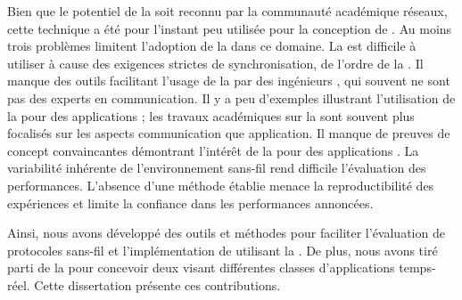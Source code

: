 \startsquarepar
Bien que le potentiel de la \ST soit reconnu par la communauté académique réseaux, cette technique a été pour l'instant peu utilisée pour la conception de \CPS.
Au moins trois problèmes limitent l'adoption de la \ST dans ce domaine.
\linebreak
{}La \ST est difficile à utiliser à cause des exigences strictes de synchronisation, de l'ordre de la \us.
Il manque des outils facilitant l'usage de la \ST par des ingénieurs \CPS, qui souvent ne sont pas des experts en communication.
\linebreak
Il y a peu d'exemples illustrant l'utilisation de la \ST pour des applications \CPS ; les travaux académiques sur la \ST sont souvent plus focalisés sur les aspects communication que application.
Il manque de preuves de concept convaincantes démontrant l'intérêt de la \ST pour des applications \CPS.
\linebreak
{}La variabilité inhérente de l'environnement sans-fil rend difficile l'évaluation des performances. L'absence d'une méthode établie menace la reproductibilité des expériences et limite la confiance dans les performances annoncées.
\stopsquarepar

\pagebreak
\startsquarepar
Ainsi, nous avons développé des outils et méthodes pour faciliter l'évaluation de protocoles sans-fil et l'implémentation de \CPS utilisant la \ST.
De plus, nous avons tiré parti de la \ST pour concevoir deux \CPS visant différentes classes d'applications temps-réel.
Cette dissertation présente ces contributions.
\stopsquarepar

